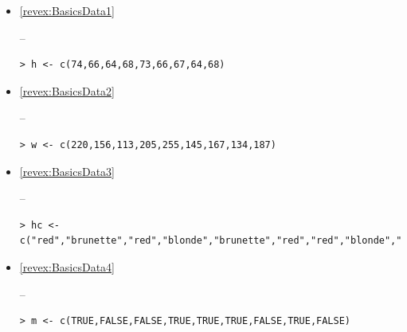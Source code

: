 \documentclass[10pt,openany]{book}\usepackage[]{graphicx}\usepackage[]{color}
\makeatletter
\newenvironment{kframe}{%
 \def\at@end@of@kframe{}%
 \ifinner\ifhmode%
  \def\at@end@of@kframe{\end{minipage}}%
  \begin{minipage}{\columnwidth}%
 \fi\fi%
 \def\FrameCommand##1{\hskip\@totalleftmargin \hskip-\fboxsep
 \colorbox{shadecolor}{##1}\hskip-\fboxsep
     \hskip-\linewidth \hskip-\@totalleftmargin \hskip\columnwidth}%
 \MakeFramed {\advance\hsize-\width
   \@totalleftmargin\z@ \linewidth\hsize
   \@setminipage}}%
 {\par\unskip\endMakeFramed%
 \at@end@of@kframe}
\newenvironment{knitrout}{}{} %
\makeatother
\begin{document}
\begin{itemize}
  \item \hypertarget{ans:BasicsData1}{\ref{revex:BasicsData1}} --
\begin{knitrout}
\color{fgcolor}\begin{kframe}
\begin{verbatim}
> h <- c(74,66,64,68,73,66,67,64,68)
\end{verbatim}
\end{kframe}
\end{knitrout}

  \item \hypertarget{ans:BasicsData2}{\ref{revex:BasicsData2}} --
\begin{knitrout}
\color{fgcolor}\begin{kframe}
\begin{verbatim}
> w <- c(220,156,113,205,255,145,167,134,187)
\end{verbatim}
\end{kframe}
\end{knitrout}

  \item \hypertarget{ans:BasicsData3}{\ref{revex:BasicsData3}} --
\begin{knitrout}
\color{fgcolor}\begin{kframe}
\begin{verbatim}
> hc <- c("red","brunette","red","blonde","brunette","red","red","blonde","blonde")
\end{verbatim}
\end{kframe}
\end{knitrout}

  \item \hypertarget{ans:BasicsData4}{\ref{revex:BasicsData4}} --
\begin{knitrout}
\color{fgcolor}\begin{kframe}
\begin{verbatim}
> m <- c(TRUE,FALSE,FALSE,TRUE,TRUE,TRUE,FALSE,TRUE,FALSE)
\end{verbatim}
\end{kframe}
\end{knitrout}


\end{itemize}
\end{document}
